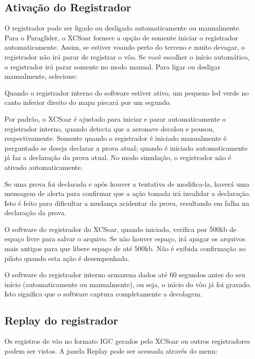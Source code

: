 \subsection*{Ativação do Registrador}
O registrador pode ser ligado ou desligado automaticamente ou manualmente.  Para o Paraglider, o XCSoar fornece a opção de somente iniciar o registrador automaticamente. Assim, se estiver voando perto do terreno e muito devagar, o registrador não irá parar de registrar o vôo.  Se você escolher o início automático, o registrador irá parar somente no modo manual.  Para ligar ou desligar manualmente, selecione:
\begin{quote}
\blink{}
\end{quote}

Quando o registrador interno do software estiver ativo, um pequeno led verde no canto inferior direito do mapa piscará por um segundo.

Por padrão, o XCSoar é ajustado para iniciar e parar automaticamente o registrador interno, quando detecta que a aeronave decolou e pousou, respectivamente.  Somente quando o registrador é iniciado manualmente é perguntado se deseja declarar a prova atual; quando é iniciado automaticamente já faz a declaração da prova atual.  No modo simulação, o registrador não é ativado automaticamente.

Se uma prova foi declarada e após houver a tentativa de modifica-la, haverá uma mensagem de alerta para confirmar que a ação tomada irá invalidar a declaração.  Isto é feito para dificultar a mudança acidentar da prova, resultando em falha na declaração da prova.

O software do registrador do XCSoar, quando iniciado, verifica por 500kb de espaço livre para salvar o arquivo.  Se não houver espaço, irá apagar os arquivos mais antigos para que libere espaço de até 500kb.  Não é exibida confirmação ao piloto quando esta ação é desempenhada. \warning

O software do registrador interno armazena dados até 60 segundos antes do seu início (automaticamente ou manualmente), ou seja, o início do vôo já foi gravado.  Isto significa que o software captura completamente a decolagem.

\subsection*{Replay do registrador}\label{sec:logger-replay}
Os registros de vôo no formato IGC gerados pelo XCSoar ou outros registradores podem ser vistos.  A janela Replay pode ser acessada através do menu:
\begin{quote}
\blink{}
\end{quote}

